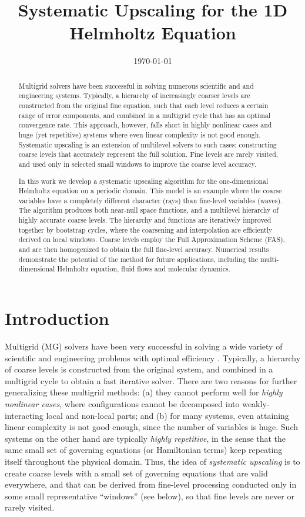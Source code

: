 \documentclass{article}
\title{Systematic Upscaling for the 1D Helmholtz Equation}
\author{}
\date{\today}
\begin{document}
\maketitle

\begin{abstract}
Multigrid solvers have been successful in solving numerous scientific and and engineering systems. Typically, a hierarchy of increasingly coarser levels are constructed from the original fine equation, such that each level reduces a certain range of error components, and combined in a multigrid cycle that has an optimal convergence rate. This approach, however, falls short in highly nonlinear cases and huge (yet repetitive) systems where even linear complexity is not good enough. Systematic upscaling is an extension of multilevel solvers to such cases: constructing coarse levels that accurately represent the full solution. Fine levels are rarely visited, and used only in selected small windows to improve the coarse level accuracy.

In this work we develop a systematic upscaling algorithm for the one-dimensional Helmholtz equation on a periodic domain. This model is an example where the coarse variables have a completely different character (rays) than fine-level variables (waves). The algorithm produces both near-null space functions, and a multilevel hierarchy of highly accurate coarse levels. The hierarchy and functions are iteratively improved together by bootstrap cycles, where the coarsening and interpolation are efficiently derived on local windows. Coarse levels employ the Full Approximation Scheme (FAS), and are then homogenized to obtain the full fine-level accuracy. Numerical results demonstrate the potential of the method for future applications, including the multi-dimensional Helmholtz equation, fluid flows and molecular dynamics.
\end{abstract}

\section{Introduction}
\label{intro}
Multigrid (MG) solvers have been very successful in solving a wide variety of scientific and engineering problems with optimal efficiency \cite{review}. Typically, a hierarchy of coarse levels is constructed from the original system, and combined in a multigrid cycle to obtain a fast iterative solver. There are two reasons for further generalizing these multigrid methods: (a) they cannot perform well for \emph{highly nonlinear cases}, where configurations cannot be decomposed into weakly-interacting local and non-local parts; and (b) for many systems, even attaining linear complexity is not good enough, since the number of variables is huge. Such systems on the other hand are typically \emph{highly repetitive}, in the sense that the same small set of governing equations (or Hamiltonian terms) keep repeating itself throughout the physical domain. Thus, the idea of \emph{systematic upscaling}  \cite{su} is to create coarse levels with  a small set of governing equations that are valid everywhere, and that can be derived from fine-level processing conducted only in some small representative “windows” (see below), so that fine levels are never or rarely visited.
\end{document}
